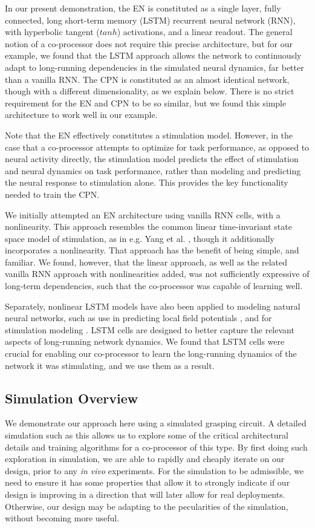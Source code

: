 \documentclass[12pt]{iopart}
\begin{document}
In our present demonstration, the EN is constituted as a single layer, fully connected,
long short-term memory (LSTM) recurrent neural network (RNN), with hyperbolic tangent ($tanh$)
activations, and a linear readout. The general notion of a co-processor does
not require this precise architecture, but for our example, we found that the LSTM
approach allows the network to continuously adapt to long-running dependencies in
the simulated neural dynamics, far better than a vanilla RNN. The CPN is constituted
as an almost identical network, though with a different dimensionality, as we explain
below. There is no strict requirement for the EN and CPN to be so similar, but we
found this simple architecture to work well in our example.

Note that the EN effectively constitutes a stimulation model. However, in the case that
a co-processor attempts to optimize for task performance, as opposed to neural
activity directly, the stimulation model predicts the effect of stimulation and neural
dynamics on task performance, rather than modeling and predicting the neural response
to stimulation alone. This provides the key functionality needed to train the CPN.

We initially attempted an EN architecture using vanilla RNN cells, with a nonlinearity.
This approach resembles the common linear time-invariant state space model of
stimulation, as in e.g. Yang et al. \cite{shanechi.stimmodel}, though it additionally
incorporates a nonlinearity. That approach has the benefit of being simple, and familiar.
We found, however, that the linear approach, as well as the related vanilla RNN
approach with nonlinearities added, was not sufficiently expressive of long-term
dependencies, such that the co-processor was capable of learning well.

Separately, nonlinear LSTM models have also been applied to modeling natural
neural networks, such as use in predicting local field potentials
\cite{kim.lstm}, and for stimulation modeling \cite{guclu.lstm}.
LSTM cells are designed to better capture the relevant aspects of
long-running network dynamics. We found that LSTM cells were crucial for
enabling our co-processor to learn the long-running dynamics of the network
it was stimulating, and we use them as a result.

\subsection{Simulation Overview}
We demonstrate our approach here using a simulated grasping circuit.
A detailed simulation such as this allows us to explore some of the critical
architectural details and training algorithms for a co-processor of this type.
By first doing such exploration in simulation, we are able to rapidly and
cheaply iterate on our design, prior to any \textit{in vivo} experiments.
For the simulation to be admissible, we need to ensure it has some
properties that allow it to strongly indicate if our design is improving in
a direction that will later allow for real deployments. Otherwise, our
design may be adapting to the pecularities of the simulation, without
becoming more useful.
\end{document}
